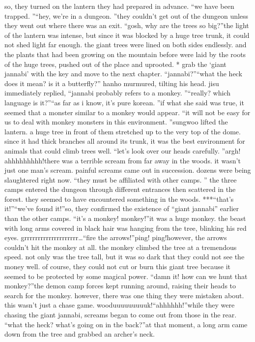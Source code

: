 so, they turned on the lantern they had prepared in advance.
“we have been trapped.
”“hey, we’re in a dungeon.
”they couldn’t get out of the dungeon unless they went out where there was an exit.
“gosh, why are the trees so big?”the light of the lantern was intense, but since it was blocked by a huge tree trunk, it could not shed light far enough.
 the giant trees were lined on both sides endlessly.
and the plants that had been growing on the mountain before were laid by the roots of the huge trees, pushed out of the place and uprooted.
* grab the ‘giant jannabi’ with the key and move to the next chapter.
“jannabi?”“what the heck does it mean? is it a butterfly?” hanho murmured, tilting his head.
jisu immediately replied, “jannabi probably refers to a monkey.
”“really? which language is it?”“as far as i know, it’s pure korean.
”if what she said was true, it seemed that a monster similar to a monkey would appear.
“it will not be easy for us to deal with monkey monsters in this environment.
”sungwoo lifted the lantern.
 a huge tree in front of them stretched up to the very top of the dome.
 since it had thick branches all around its trunk, it was the best environment for animals that could climb trees well.
“let’s look over our heads carefully.
”argh! ahhhhhhhhh!there was a terrible scream from far away in the woods.
 it wasn’t just one man’s scream.
 painful screams came out in succession.
dozens were being slaughtered right now.
“they must be affiliated with other camps.
”
the three camps entered the dungeon through different entrances then scattered in the forest.
 they seemed to have encountered something in the woods.
***“that’s it!”“we’ve found it!”so, they confirmed the existence of “giant jannabi” earlier than the other camps.
“it’s a monkey! monkey!”it was a huge monkey.
 the beast with long arms covered in black hair was hanging from the tree, blinking his red eyes.
grrrrrrrrrrrrrrrrrrrr…“fire the arrows!”ping! ping!however, the arrows couldn’t hit the monkey at all.
 the monkey climbed the tree at a tremendous speed.
 not only was the tree tall, but it was so dark that they could not see the money well.
of course, they could not cut or burn this giant tree because it seemed to be protected by some magical power.
“damn it! how can we hunt that monkey?”the demon camp forces kept running around, raising their heads to search for the monkey.
however, there was one thing they were mistaken about.
this wasn’t just a chase game.
wooduuuuuuuuuk!“ahhhhhh!”while they were chasing the giant jannabi, screams began to come out from those in the rear.
 “what the heck? what’s going on in the back?”at that moment, a long arm came down from the tree and grabbed an archer’s neck.
